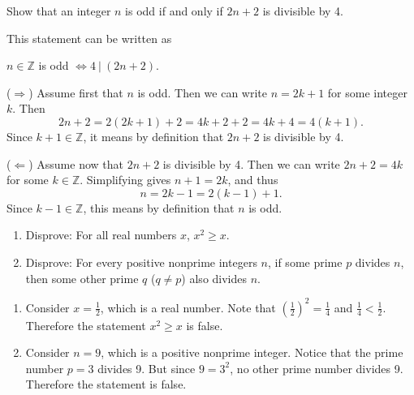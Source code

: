\documentclass{article}
\theoremstyle{definition}
\begin{document}
\begin{question}
    Show that an integer $n$ is odd if and only if $2n+2$ is divisible by 4.
\end{question}
\begin{solution}
This statement can be written as 
	
	\begin{center}
		$n \in \mathbb{Z}$ is odd $\iff 4 ~|~ (2n+2)$.
	\end{center}
	
 ($\Rightarrow$) Assume first that $n$ is odd. Then we can write $n = 2k+1$ for some integer $k$. Then
	\[
	2 n + 2 = 2 (2k + 1) + 2 = 4 k + 2 + 2 = 4 k + 4 = 4 (k+1).
	\]
	Since $k+1 \in \mathbb{Z}$, it means by definition that $2 n + 2$ is divisible by 4.
	
	($\Leftarrow$)  Assume now that $2n + 2$ is divisible by 4. Then we can write $2n + 2 = 4k$ for some $k \in \mathbb{Z}$. Simplifying gives $n + 1 = 2k$, and thus
	\[
	n = 2 k - 1 = 2 (k - 1) + 1.
	\]
	Since $k - 1 \in \mathbb{Z}$, this means by definition that $n$ is odd.
\end{solution}

\begin{question}
    \begin{enumerate}
        \item Disprove: For all real numbers $x$, $x^2\geq x$.
        \item Disprove: For every positive nonprime integers $n$, if some prime $p$ divides $n$, then some other prime $q$ ($q\neq p$) also divides $n$.
    \end{enumerate}
\end{question}
\begin{solution}
\begin{enumerate}
\item Consider $x=\frac{1}{2}$, which is a real number. Note that $\left(\frac{1}{2}\right)^2=\frac{1}{4}$ and $\frac{1}{4}< \frac{1}{2}$. Therefore the statement $x^2\geq x$ is false.

\item Consider $n=9$, which is a positive nonprime integer. Notice that the prime number $p=3$ divides 9. But since $9=3^2$, no other prime number divides 9. Therefore the statement is false.
\end{enumerate}
\end{solution}
\end{document}
